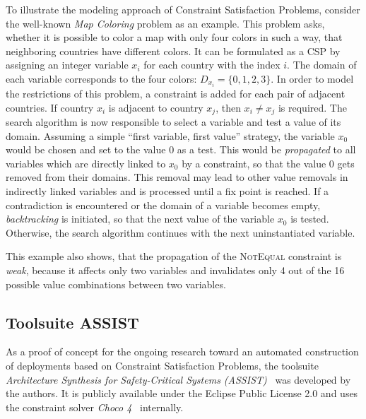 \documentclass[english,biblatex]{lni}
\begin{document}
To illustrate the modeling approach of Constraint Satisfaction Problems, consider the well-known \emph{Map Coloring} problem as an example.
This problem asks, whether it is possible to color a map with only four colors in such a way, that neighboring countries have different colors.
It can be formulated as a CSP by assigning an integer variable $x_i$ for each country with the index $i$.
The domain of each variable corresponds to the four colors: $D_{x_i}=\{0,1,2,3\}$.
In order to model the restrictions of this problem, a constraint is added for each pair of adjacent countries.
If country $x_i$ is adjacent to country $x_j$, then $x_i \neq x_j$ is required.
The search algorithm is now responsible to select a variable and test a value of its domain.
Assuming a simple ``first variable, first value'' strategy, the variable $x_0$ would be chosen and set to the value $0$ as a test.
This would be \emph{propagated} to all variables which are directly linked to $x_0$ by a constraint, so that the value $0$ gets removed from their domains.
This removal may lead to other value removals in indirectly linked variables and is processed until a fix point is reached.
If a contradiction is encountered or the domain of a variable becomes empty, \emph{backtracking} is initiated, so that the next value of the variable $x_0$ is tested.
Otherwise, the search algorithm continues with the next uninstantiated variable.

This example also shows, that the propagation of the \textsc{NotEqual} constraint is \emph{weak}, because it affects only two variables and invalidates only 4 out of the 16 possible value combinations between two variables.

\subsection{Toolsuite ASSIST}

As a proof of concept for the ongoing research toward an automated construction of deployments based on Constraint Satisfaction Problems, the toolsuite \emph{Architecture Synthesis for Safety-Critical Systems (ASSIST)}~\cite{ASSIST} was developed by the authors.
It is publicly available under the Eclipse Public License 2.0 and uses the constraint solver \emph{Choco 4}~\cite{Prudhomme2016} internally.
\end{document}
